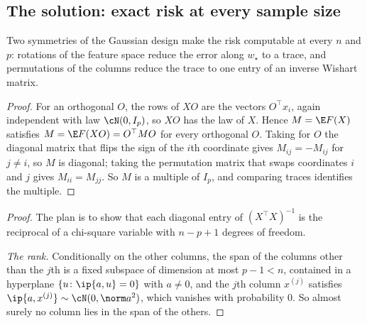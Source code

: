 \begin{refsection}
\section{The solution: exact risk at every sample size}\label{sec:doubledescent:exact}

Two symmetries of the Gaussian design make the risk computable at every $n$ and $p$: rotations of the feature space reduce the error along $w_\star$ to a trace, and permutations of the columns reduce the trace to one entry of an inverse Wishart matrix.


\begin{proof}
For an orthogonal $O$, the rows of $XO$ are the vectors $O^\top x_i$, again independent with law $\cN(0,I_p)$, so $XO$ has the law of $X$. Hence $M=\E F(X)$ satisfies $M=\E F(XO)=O^\top MO$ for every orthogonal $O$. Taking for $O$ the diagonal matrix that flips the sign of the $i$th coordinate gives $M_{ij}=-M_{ij}$ for $j\ne i$, so $M$ is diagonal; taking the permutation matrix that swaps coordinates $i$ and $j$ gives $M_{ii}=M_{jj}$. So $M$ is a multiple of $I_p$, and comparing traces identifies the multiple.
\end{proof}


\begin{proof}
The plan is to show that each diagonal entry of $(X^\top X)^{-1}$ is the reciprocal of a chi-square variable with $n-p+1$ degrees of freedom.

\emph{The rank.} Conditionally on the other columns, the span of the columns other than the $j$th is a fixed subspace of dimension at most $p-1<n$, contained in a hyperplane $\{u\colon\ip{a,u}=0\}$ with $a\ne0$, and the $j$th column $x^{(j)}$ satisfies $\ip{a,x^{(j)}}\sim\cN(0,\norm a^2)$, which vanishes with probability $0$. So almost surely no column lies in the span of the others.


\end{proof}
\end{refsection}
